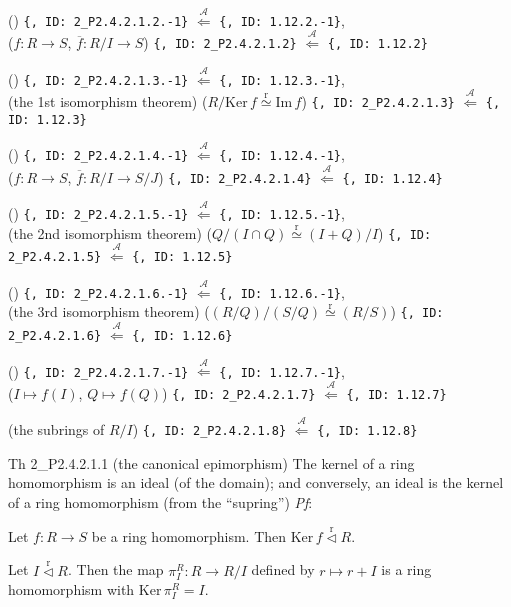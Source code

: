 \documentclass{article}
\newcommand{\nles}{\vartriangleleft}
\newcommand{\Ker}{\text{Ker}\,}
\newcommand{\Ima}{\text{Im}\,}
\newcommand{\Riso}{\overset{\text{r}}{\simeq}} %
\newcommand{\ideal}{\overset{\text{r}}{\nles}} %
\begin{document}
\begin{Rmk}{}
\begin{Rmk}{}
\begin{compactenum}
            \item () \verb|{, ID: 2_P2.4.2.1.2.-1}| $\overset{\mathcal{A}}{\Longleftarrow}$ \verb|{, ID: 1.12.2.-1}|, \\ 
            ($f: R\to S$, $\overline{f}: R/I\to S$) \verb|{, ID: 2_P2.4.2.1.2}| $\overset{\mathcal{A}}{\Longleftarrow}$ \verb|{, ID: 1.12.2}|
            \item () \verb|{, ID: 2_P2.4.2.1.3.-1}| $\overset{\mathcal{A}}{\Longleftarrow}$ \verb|{, ID: 1.12.3.-1}|, \\ 
            (the 1st isomorphism theorem) ($R/\Ker f\Riso \Ima f$) \verb|{, ID: 2_P2.4.2.1.3}| $\overset{\mathcal{A}}{\Longleftarrow}$ \verb|{, ID: 1.12.3}|
            \item () \verb|{, ID: 2_P2.4.2.1.4.-1}| $\overset{\mathcal{A}}{\Longleftarrow}$ \verb|{, ID: 1.12.4.-1}|, \\ 
            ($f: R\to S$, $\overline{f}: R/I\to S/J$) \verb|{, ID: 2_P2.4.2.1.4}| $\overset{\mathcal{A}}{\Longleftarrow}$ \verb|{, ID: 1.12.4}|
            \item () \verb|{, ID: 2_P2.4.2.1.5.-1}| $\overset{\mathcal{A}}{\Longleftarrow}$ \verb|{, ID: 1.12.5.-1}|, \\ 
            (the 2nd isomorphism theorem) ($ Q/(I\cap Q) \Riso (I+Q)/I $) \verb|{, ID: 2_P2.4.2.1.5}| $\overset{\mathcal{A}}{\Longleftarrow}$ \verb|{, ID: 1.12.5}|
            \item () \verb|{, ID: 2_P2.4.2.1.6.-1}| $\overset{\mathcal{A}}{\Longleftarrow}$ \verb|{, ID: 1.12.6.-1}|, \\ 
            (the 3rd isomorphism theorem) ($ (R/Q)\Big/ (S/Q) \Riso (R/S) $) \verb|{, ID: 2_P2.4.2.1.6}| $\overset{\mathcal{A}}{\Longleftarrow}$ \verb|{, ID: 1.12.6}|
            \item () \verb|{, ID: 2_P2.4.2.1.7.-1}| $\overset{\mathcal{A}}{\Longleftarrow}$ \verb|{, ID: 1.12.7.-1}|, \\ 
            ($I\mapsto f(I)$, $Q\mapsto f(Q)$) \verb|{, ID: 2_P2.4.2.1.7}| $\overset{\mathcal{A}}{\Longleftarrow}$ \verb|{, ID: 1.12.7}|
            \item (the subrings of $R/I$) \verb|{, ID: 2_P2.4.2.1.8}| $\overset{\mathcal{A}}{\Longleftarrow}$ \verb|{, ID: 1.12.8}|
        \end{compactenum}
    \end{Rmk}
\end{Rmk}

\begin{Th}{Th 2\_P2.4.2.1.1 (the canonical epimorphism)}
    The kernel of a ring homomorphism is an ideal (of the domain); and conversely, an ideal is the kernel of a ring homomorphism (from the “supring”)
    \tcblower
    \textit{Pf}: 
    \begin{compactenum}
        \item Let $f: R\to S$ be a ring homomorphism. Then $\Ker f\ideal R$.
        \item Let $I\ideal R$. Then the map $\pi_I^R: R\to R/I$ defined by $r\mapsto r+I$ is a ring homomorphism with $\Ker \pi_I^R = I$.
    \end{compactenum}
\end{Th}
\end{document}
